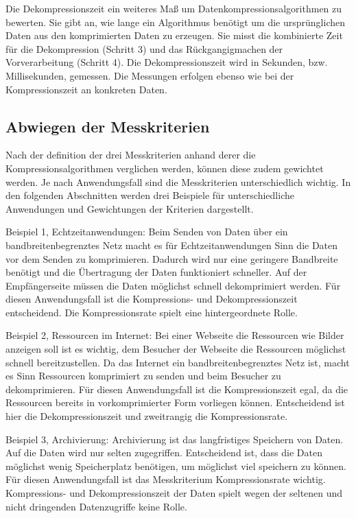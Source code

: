 \documentclass[conference]{IEEEtran}
\begin{document}
Die Dekompressionszeit ein weiteres Maß um Datenkompressionsalgorithmen zu bewerten.
Sie gibt an, wie lange ein Algorithmus benötigt um 
die ursprünglichen Daten aus den komprimierten Daten zu erzeugen.
Sie misst die kombinierte Zeit für die Dekompression (Schritt 3) und das 
Rückgangigmachen der Vorverarbeitung (Schritt 4).
Die Dekompressionszeit wird in Sekunden, bzw. Millisekunden, gemessen.
Die Messungen erfolgen ebenso wie bei der Kompressionszeit an konkreten Daten.

\subsection{Abwiegen der Messkriterien}

Nach der definition der drei Messkriterien anhand derer die 
Kompressionsalgorithmen verglichen werden, können diese zudem gewichtet 
werden.
Je nach Anwendungsfall sind die Messkriterien unterschiedlich wichtig.
In den folgenden Abschnitten werden drei Beispiele für unterschiedliche 
Anwendungen und Gewichtungen der Kriterien dargestellt.

Beispiel 1, Echtzeitanwendungen: 
Beim Senden von Daten über ein bandbreitenbegrenztes Netz macht es für 
Echtzeitanwendungen Sinn die Daten vor dem Senden zu komprimieren.
Dadurch wird nur eine geringere Bandbreite benötigt und die Übertragung der 
Daten funktioniert schneller. 
Auf der Empfängerseite müssen die Daten möglichst schnell dekomprimiert werden.
Für diesen Anwendungsfall ist die Kompressions- und Dekompressionszeit entscheidend.
Die Kompressionsrate spielt eine hintergeordnete Rolle.

Beispiel 2, Ressourcen im Internet:
Bei einer Webseite die Ressourcen wie Bilder anzeigen soll ist es wichtig,
dem Besucher der Webseite die Ressourcen möglichst schnell bereitzustellen.
Da das Internet ein bandbreitenbegrenztes Netz ist, macht es Sinn Ressourcen komprimiert
zu senden und beim Besucher zu dekomprimieren.
Für diesen Anwendungsfall ist die Kompressionszeit egal, da die Ressourcen 
bereits in vorkomprimierter Form vorliegen können.
Entscheidend ist hier die Dekompressionszeit und zweitrangig die Kompressionsrate.

Beispiel 3, Archivierung: 
Archivierung ist das langfristiges Speichern von Daten. 
Auf die Daten wird nur selten zugegriffen. 
Entscheidend ist, dass die Daten möglichst wenig Speicherplatz benötigen,
um möglichst viel speichern zu können.
Für diesen Anwendungsfall ist das Messkriterium Kompressionsrate wichtig.
Kompressions- und Dekompressionszeit der Daten spielt wegen der seltenen und 
nicht dringenden Datenzugriffe keine Rolle.
\end{document}
